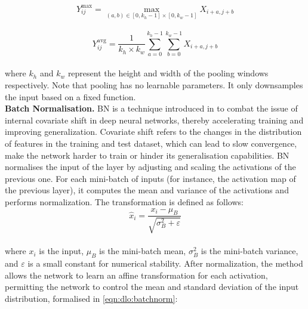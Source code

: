 
\begin{equation}
  \label{eqn:dlo:max_pooling}
  Y^{\text{max}}_{ij} = \max_{(a,b) \in [0, k_h-1] \times [0, k_w-1]} X_{i + a, j + b}
\end{equation}\\
  
  \begin{equation}
  \label{eqn:dlo:avg_pooling}
  Y^{\text{avg}}_{ij} = \frac{1}{k_h \times k_w} \sum_{a=0}^{k_h-1} \sum_{b=0}^{k_w-1} X_{i + a, j + b}  
\end{equation}\\

\noindent where $k_h$ and $k_w$ represent the height and width of the pooling
windows respectively. Note that pooling has no learnable parameters. It only
downsamples the input based on a fixed function.\\


\noindent \textbf{Batch Normalisation.} \ac{BN} is a technique introduced in
\cite{DBLP:conf/icml/IoffeS15} to combat the issue of internal covariate shift
in deep neural networks, thereby accelerating training and improving
generalization. Covariate shift refers to the changes in the distribution of
features in the training and test dataset, which can lead to slow convergence,
make the network harder to train or hinder its generalisation capabilities.
\ac{BN} normalises the input of the layer by adjusting and scaling the
activations of the previous one. For each mini-batch of inputs (for instance,
the activation map of the previous layer), it computes the mean and variance of
the activations and performs normalization. The transformation is defined as
follows:\\

\begin{equation}
  \label{eqn:dlo:batchnorm}
  \hat{x}_{i} = \frac{x_{i} - \mu_{B}}{\sqrt{\sigma_{B}^{2} + \varepsilon}}
\end{equation}\\

\noindent where $x_{i}$ is the input, $\mu_{B}$ is the mini-batch mean,
$\sigma_{B}^{2}$ is the mini-batch variance, and $\varepsilon$ is a small
constant for numerical stability. After normalization, the method allows the
network to learn an affine transformation for each activation, permitting the
network to control the mean and standard deviation of the input distribution,
formalised in \cref{eqn:dlo:batchnorm}:\\

